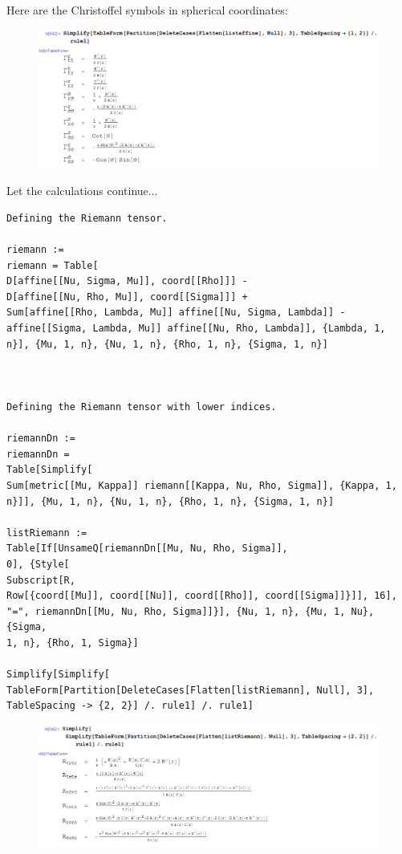 \documentclass{book}
\theoremstyle{definition}
\begin{document}
Here are the Christoffel symbols in spherical coordinates:
\begin{figure}[!htb]
	\centering
	\includegraphics[scale=0.3]{sphericalchristoffel}
\end{figure}

Let the calculations continue...
\begin{lstlisting}
Defining the Riemann tensor.

riemann := 
riemann = Table[
D[affine[[Nu, Sigma, Mu]], coord[[Rho]]] - 
D[affine[[Nu, Rho, Mu]], coord[[Sigma]]] + 
Sum[affine[[Rho, Lambda, Mu]] affine[[Nu, Sigma, Lambda]] - 
affine[[Sigma, Lambda, Mu]] affine[[Nu, Rho, Lambda]], {Lambda, 1, 
n}], {Mu, 1, n}, {Nu, 1, n}, {Rho, 1, n}, {Sigma, 1, n}]



Defining the Riemann tensor with lower indices.

riemannDn := 
riemannDn = 
Table[Simplify[
Sum[metric[[Mu, Kappa]] riemann[[Kappa, Nu, Rho, Sigma]], {Kappa, 1, 
n}]], {Mu, 1, n}, {Nu, 1, n}, {Rho, 1, n}, {Sigma, 1, n}]

listRiemann := 
Table[If[UnsameQ[riemannDn[[Mu, Nu, Rho, Sigma]], 
0], {Style[
Subscript[R, 
Row[{coord[[Mu]], coord[[Nu]], coord[[Rho]], coord[[Sigma]]}]], 16], 
"=", riemannDn[[Mu, Nu, Rho, Sigma]]}], {Nu, 1, n}, {Mu, 1, Nu}, {Sigma, 
1, n}, {Rho, 1, Sigma}]

Simplify[Simplify[
TableForm[Partition[DeleteCases[Flatten[listRiemann], Null], 3], 
TableSpacing -> {2, 2}] /. rule1] /. rule1]
\end{lstlisting}

\begin{figure}[!htb]
	\centering
	\includegraphics[scale=0.4]{sphericalriemann}
\end{figure}
\end{document}
